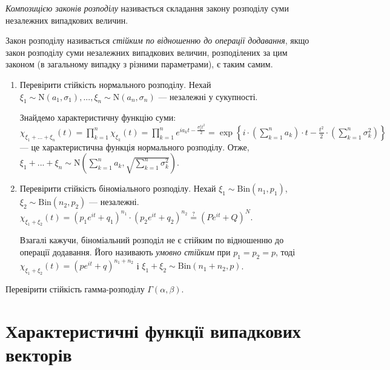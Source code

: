 \begin{definition}
    \emph{Композицією законів розподілу} називається складання закону розподілу суми незалежних випадкових величин.
    
    Закон розподілу називається \emph{стійким по відношенню до операції додавання},
    якщо закон розподілу суми незалежних випадкових величин, розподілених за цим законом (в загальному випадку з різними параметрами),
    є таким самим.
\end{definition}
\begin{example}
    \begin{enumerate}
        \item Перевірити стійкість нормального розподілу. Нехай $\xi_1 \sim \mathrm{N}(a_1, \sigma_1), ..., \xi_n \sim \mathrm{N}(a_n, \sigma_n)$ ---
        незалежні у сукупності. 
    
        Знайдемо характеристичну функцію суми: $\chi_{\xi_1 + ... + \xi_n}(t) = \prod\limits_{k=1}^n \chi_{\xi_k}(t)=
        \prod\limits_{k=1}^n e^{ia_k t - \frac{\sigma_k^2 t^2}{2}} = 
        \exp\left\{i\cdot \left( \sum\limits_{k=1}^n a_k\right)\cdot t - \frac{t^2}{2}\cdot\left( \sum\limits_{k=1}^n \sigma_k^2\right)\right\}$ ---
        це характеристична функція нормального розподілу. Отже, $\xi_1 + ... + \xi_n \sim \mathrm{N}\left(\sum\limits_{k=1}^n a_k,  \sqrt{\sum\limits_{k=1}^n \sigma_k^2}\right)$.
        \item Перевірити стійкість біноміального розподілу. Нехай $\xi_1 \sim \mathrm{Bin}(n_1, p_1)$, $\xi_2 \sim \mathrm{Bin}(n_2, p_2)$ --- незалежні.
        $\chi_{\xi_1 + \xi_2} (t) = \left( p_1 e^{it} + q_1\right)^{n_1} \cdot \left( p_2 e^{it} + q_2\right)^{n_2} \overset{?}{=} \left(P e^{it} + Q\right)^N$.

        Взагалі кажучи, біноміальний розподіл не є стійким по відношенню до  операції додавання.
        Його називають \emph{умовно стійким} при $p_1 = p_2 = p$, тоді
        $\chi_{\xi_1 + \xi_2} (t) = \left( p e^{it} + q\right)^{n_1 + n_2}$ і $\xi_1 + \xi_2 \sim \mathrm{Bin}(n_1+n_2, p)$.
    \end{enumerate}
\end{example}

\begin{exercise}
    Перевірити стійкість гамма-розподілу $\Gamma(\alpha, \beta)$.
\end{exercise}

\section{Характеристичні функції випадкових векторів}
